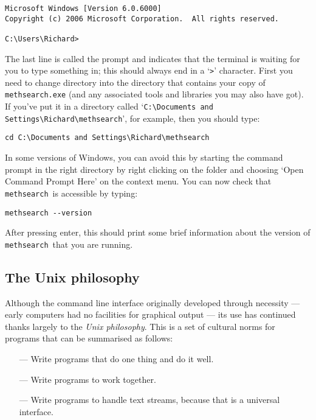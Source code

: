 \documentclass[a4paper,11pt,oneside]{book}
\makeatletter
\def\textitidx#1{\textit{#1}\index{#1}}
\newcommand{\oi}[1]{\index{#1@{\hspace*{-\optwidth}\texttt{-}\texttt{#1}}}}
\newcommand{\symidx}[2]{} %
\def\methsearch{\texttt{meth\-search}}
\makeatother
\begin{document}
\begin{Verbatim}
Microsoft Windows [Version 6.0.6000]
Copyright (c) 2006 Microsoft Corporation.  All rights reserved.

C:\Users\Richard>
\end{Verbatim}

The last line is called the prompt and indicates
that the terminal is waiting for you to type something in; 
this should always end in a `\verb+>+' character. %
First you need to change directory into the directory that contains
your copy of \texttt{methsearch.exe} (and any associated tools and libraries
you may also have got).  If you've put it in a directory called
`\verb+C:\Documents and Settings\Richard\methsearch+', for example,
then you should type:

\begin{Verbatim}
cd C:\Documents and Settings\Richard\methsearch
\end{Verbatim}

In some versions of Windows, you can avoid this by
starting the command prompt in the right
directory by right clicking on the folder and choosing 
`Open Command Prompt Here' on the context menu.
You can now check that \methsearch\ is accessible by typing:

\begin{Verbatim}
methsearch --version
\end{Verbatim}
\oi{V}

After pressing enter, this should print some brief information about the 
version of \methsearch\ that you are running.

\subsection{The Unix philosophy}\label{unixphil}

Although the command line interface originally developed through necessity
--- early computers had no facilities for graphical output --- its use
has continued thanks largely to the \textitidx{Unix philosophy}.  This is 
a set of cultural norms for programs that can be summarised as follows:

\begin{itemize}
\item[---] Write programs that do one thing and do it well.
\item[---] Write programs to work together. 
\item[---] Write programs to handle text streams, 
because that is a universal interface.
\end{itemize}
\end{document}
